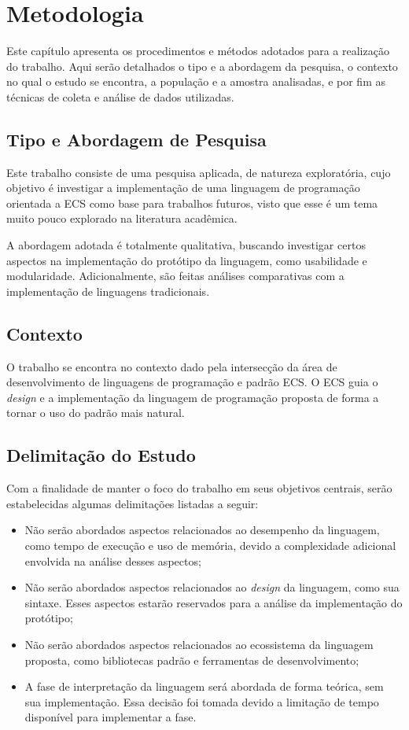 \chapter{Metodologia}\label{ch:metodologia}

Este capítulo apresenta os procedimentos e métodos adotados para a realização do trabalho. Aqui serão detalhados o tipo e a abordagem da pesquisa, o contexto no qual o estudo se encontra, a população e a amostra analisadas, e por fim as técnicas de coleta e análise de dados utilizadas.

\section{Tipo e Abordagem de Pesquisa}

Este trabalho consiste de uma pesquisa aplicada, de natureza exploratória, cujo objetivo é investigar a implementação de uma linguagem de programação orientada a ECS como base para trabalhos futuros, visto que esse é um tema muito pouco explorado na literatura acadêmica.

A abordagem adotada é totalmente qualitativa, buscando investigar certos aspectos na implementação do protótipo da linguagem, como usabilidade e modularidade. Adicionalmente, são feitas análises comparativas com a implementação de linguagens tradicionais.

\section{Contexto}

O trabalho se encontra no contexto dado pela intersecção da área de desenvolvimento de linguagens de programação e padrão ECS. O ECS guia o \textit{design} e a implementação da linguagem de programação proposta de forma a tornar o uso do padrão mais natural.

\section{Delimitação do Estudo}

Com a finalidade de manter o foco do trabalho em seus objetivos centrais, serão estabelecidas algumas delimitações listadas a seguir:

\begin{itemize}
    \item Não serão abordados aspectos relacionados ao desempenho da linguagem, como tempo de execução e uso de memória, devido a complexidade adicional envolvida na análise desses aspectos;
    \item Não serão abordados aspectos relacionados ao \textit{design} da linguagem, como sua sintaxe. Esses aspectos estarão reservados para a análise da implementação do protótipo;
    \item Não serão abordados aspectos relacionados ao ecossistema da linguagem proposta, como bibliotecas padrão e ferramentas de desenvolvimento;
    \item A fase de interpretação da linguagem será abordada de forma teórica, sem sua implementação. Essa decisão foi tomada devido a limitação de tempo disponível para implementar a fase.
\end{itemize}

